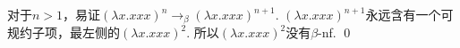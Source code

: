 \begin{pf} \rm 
    对于$n>1$，易证$(\lambda x.xxx)^n\rightarrow_\beta(\lambda x.xxx)^{n+1}$.
    $(\lambda x.xxx)^{n+1}$永远含有一个可规约子项，最左侧的$(\lambda x.xxx)^2$. 所以$(\lambda x.xxx)^2$没有$\beta$-nf.
    \qed
\end{pf}